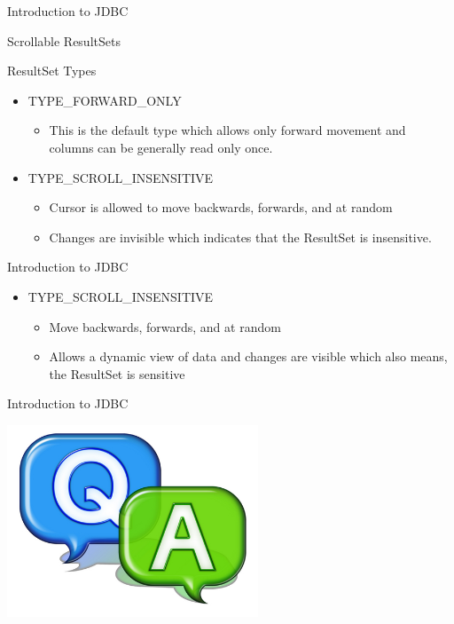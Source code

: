 \documentclass[14pt]{beamer}
\begin{document}
\begin{frame}[fragile]{Introduction to JDBC}
\begin{block}{}
Scrollable ResultSets
\end{block}
\begin{block}{}
ResultSet Types
\end{block}
\begin{itemize}
\item TYPE\_FORWARD\_ONLY
\begin{itemize}
\item This is the default type which allows only forward movement and columns can be generally read only once.
\end{itemize}
\item TYPE\_SCROLL\_INSENSITIVE
\begin{itemize}
\item Cursor is allowed to move backwards, forwards, and at random
\item Changes are invisible which indicates that the ResultSet is  insensitive.
\end{itemize}
\end{itemize}
\end{frame}

\begin{frame}[fragile]{Introduction to JDBC}
\begin{itemize}
\item TYPE\_SCROLL\_INSENSITIVE
\begin{itemize}
\item Move backwards, forwards, and at random 
\item Allows a dynamic view of data and changes are visible which also means, the ResultSet is sensitive
\end{itemize}
\end{itemize}
\end{frame}

\begin{frame}[fragile]{Introduction to JDBC}
\begin{center}
    \includegraphics[scale=0.5]{QA.png}
  \end{center}
\end{frame}
\end{document}
